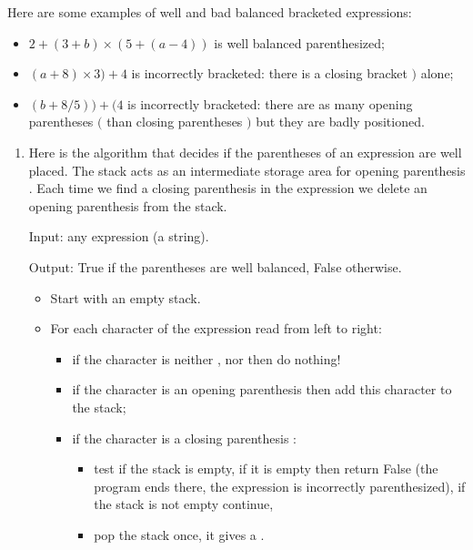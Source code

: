 \documentclass[11pt,class=report,crop=false]{standalone}
\begin{document}
\begin{activite}


Here are some examples of well and bad balanced bracketed expressions:
\begin{itemize}
  \item $2 + (3 + b) \times (5 + (a - 4))$ is well balanced parenthesized;
  \item $(a+ 8) \times 3 ) + 4$ is incorrectly bracketed: there is a closing bracket \og{}$)$\fg{} alone;
  \item $(b + 8 / 5)) + (4$ is incorrectly bracketed: there are as many opening parentheses  \og{}$($\fg{} than closing parentheses \og{}$)$\fg{} but they are badly positioned.
\end{itemize}

\begin{enumerate}
  \item 
 
  Here is the algorithm that decides if the parentheses of an expression are well placed. 
  The stack acts as an intermediate storage area for opening parenthesis . Each time we find a closing parenthesis  in the expression we delete an opening parenthesis from the stack.
  
  \begin{algorithme}
  Input: any expression (a string).
  
  Output: \og{}True\fg{} if the parentheses are well balanced, \og{}False\fg{} otherwise. 
  
  \begin{itemize}
   \item Start with an empty stack.   
   
   \item For each character of the expression read from left to right:
   \begin{itemize}
     \item if the character is neither , nor  then do nothing!
     
     \item if the character is an opening parenthesis  then add this character to the stack;
     
     \item if the character is a closing parenthesis :
       \begin{itemize}
         \item test if the stack is empty, if it is empty then return \og{}False\fg{} (the program ends there, the expression is incorrectly parenthesized), if the stack is not empty continue, 
         \item pop the stack once, it gives a .
       \end{itemize}
     \end{itemize} 
       

\end{itemize}
\end{algorithme}
\end{enumerate}
\end{activite}
\end{document}
